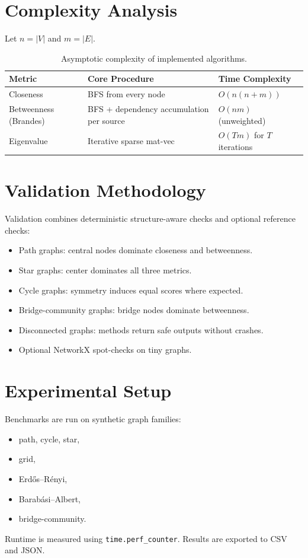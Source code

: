 \documentclass[11pt]{article}
\begin{document}
\section{Complexity Analysis}
Let $n=|V|$ and $m=|E|$.

\begin{table}[h!]
\centering
\begin{tabular}{@{}lll@{}}
\toprule
Metric & Core Procedure & Time Complexity \\
\midrule
Closeness & BFS from every node & $O(n(n+m))$ \\
Betweenness (Brandes) & BFS + dependency accumulation per source & $O(nm)$ (unweighted) \\
Eigenvalue & Iterative sparse mat-vec & $O(Tm)$ for $T$ iterations \\
\bottomrule
\end{tabular}
\caption{Asymptotic complexity of implemented algorithms.}
\end{table}

\section{Validation Methodology}
Validation combines deterministic structure-aware checks and optional reference checks:
\begin{itemize}[leftmargin=*]
    \item Path graphs: central nodes dominate closeness and betweenness.
    \item Star graphs: center dominates all three metrics.
    \item Cycle graphs: symmetry induces equal scores where expected.
    \item Bridge-community graphs: bridge nodes dominate betweenness.
    \item Disconnected graphs: methods return safe outputs without crashes.
    \item Optional NetworkX spot-checks on tiny graphs.
\end{itemize}

\section{Experimental Setup}
Benchmarks are run on synthetic graph families:
\begin{itemize}[leftmargin=*]
    \item path, cycle, star,
    \item grid,
    \item Erd\H{o}s--R\'enyi,
    \item Barab\'asi--Albert,
    \item bridge-community.
\end{itemize}
Runtime is measured using \texttt{time.perf\_counter}. Results are exported to CSV and JSON.
\end{document}
